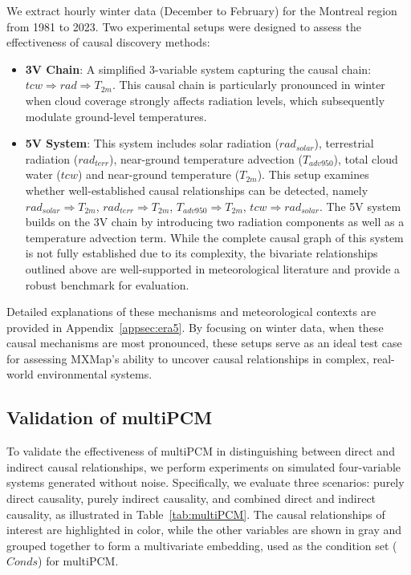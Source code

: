 We extract hourly winter data (December to February) for the Montreal region from 1981 to 2023. Two experimental setups were designed to assess the effectiveness of causal discovery methods:

\begin{itemize}
    \item \textbf{3V Chain}: 
    A simplified 3-variable system capturing the causal chain: $tcw \Rightarrow rad \Rightarrow  T_{2m}$. 
    This causal chain is particularly pronounced in winter when cloud coverage strongly affects radiation levels, which subsequently modulate ground-level temperatures.
    \item \textbf{5V System}: This system includes solar radiation ($rad_{solar}$), terrestrial radiation ($rad_{terr}$), near-ground temperature advection ($T_{adv950}$), total cloud water ($tcw$) and near-ground temperature ($T_{2m}$). This setup examines whether well-established causal relationships can be detected, namely $rad_{solar} \Rightarrow T_{2m}$, $rad_{terr} \Rightarrow T_{2m}$, $T_{adv950} \Rightarrow T_{2m}$, $tcw\Rightarrow rad_{solar}$. 
    The 5V system builds on the 3V chain by introducing two radiation components as well as a temperature advection term. While the complete causal graph of this system is not fully established due to its complexity, the bivariate relationships outlined above are well-supported in meteorological literature and provide a robust benchmark for evaluation.
\end{itemize}

Detailed explanations of these mechanisms and meteorological contexts are provided in Appendix~\ref{appsec:era5}. By focusing on winter data, when these causal mechanisms are most pronounced, these setups serve as an ideal test case for assessing MXMap’s ability to uncover causal relationships in complex, real-world environmental systems.


\subsection{Validation of multiPCM}
\label{sec:valid_multiPCM}

To validate the effectiveness of multiPCM in distinguishing between direct and indirect causal relationships, we perform experiments on simulated four-variable systems generated without noise. Specifically, we evaluate three scenarios: purely direct causality, purely indirect causality, and combined direct and indirect causality, as illustrated in Table~\ref{tab:multiPCM}. The causal relationships of interest are highlighted in color, while the other variables are shown in gray and grouped together to form a multivariate embedding, used as the condition set ($Conds$) for multiPCM.

